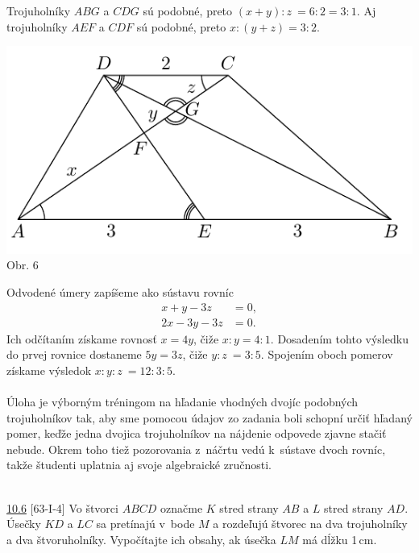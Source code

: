 Trojuholníky $ABG$ a $CDG$ sú podobné, preto $(x + y) : z~= 6 : 2 = 3 : 1$. Aj trojuholníky $AEF$ a $CDF$ sú podobné, preto $x : (y + z) = 3 : 2$.
\begin{center}
\includegraphics{obrazky/64D4}\\
Obr. 6
\end{center}
Odvodené úmery zapíšeme ako sústavu rovníc
\begin{align*}
x + y - 3z &= 0,\\
2x - 3y - 3z &= 0.
\end{align*}
Ich odčítaním získame rovnosť $x = 4y$, čiže $x : y = 4 : 1$. Dosadením tohto výsledku do prvej rovnice dostaneme $5y = 3z$, čiže $y : z~= 3 : 5$. Spojením oboch pomerov získame výsledok $x : y : z~= 12 : 3 : 5$.\\
\\
\kom Úloha je výborným tréningom na hľadanie vhodných dvojíc podobných trojuholníkov tak, aby sme pomocou údajov zo zadania boli schopní určiť hľadaný pomer, keďže jedna dvojica trojuholníkov na nájdenie odpovede zjavne stačiť nebude. Okrem toho tiež pozorovania z~náčrtu vedú k~sústave dvoch rovníc, takže študenti uplatnia aj svoje algebraické zručnosti.\\
\\
\begin{tcolorbox}[breakable,notitle,boxrule=0pt,colback=light-gray,colframe=light-gray]\ul{10.6} [63-I-4] Vo štvorci $ABCD$ označme $K$ stred strany $AB$ a $L$ stred strany $AD$. Úsečky $KD$ a $LC$ sa pretínajú v~bode $M$ a rozdeľujú štvorec na dva trojuholníky a dva štvoruholníky. Vypočítajte ich obsahy, ak úsečka $LM$ má dĺžku 1\,cm.

\end{tcolorbox}

